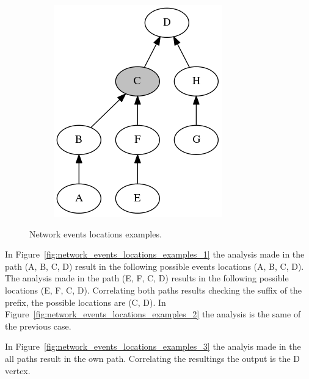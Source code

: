 \begin{figure}[H]
{\begin{subfigure}[b]{0.3\textwidth}
            \includegraphics[width=\textwidth]{./figures/methodology/spatial_time_correlation/event_tree_graph_4.png}
            \caption{}\label{fig:network_events_locations_examples_4}
        \end{subfigure}%
    }
    \caption{Network events locations examples.}
\label{fig:network_events_locations_examples}
\end{figure}%

In Figure~\ref{fig:network_events_locations_examples_1} the analysis made
in the path (A, B, C, D) result in the following possible events locations (A,
B, C, D). The analysis made in the path (E, F, C, D) results in the following
possible locations (E, F, C, D). Correlating both paths results checking the
suffix of the prefix, the possible locations are (C, D). In
Figure~\ref{fig:network_events_locations_examples_2} the analysis is the same
of the previous case.

In Figure~\ref{fig:network_events_locations_examples_3} the analyis made in the
all paths result in the own path. Correlating the resultings the output is the
D vertex.

